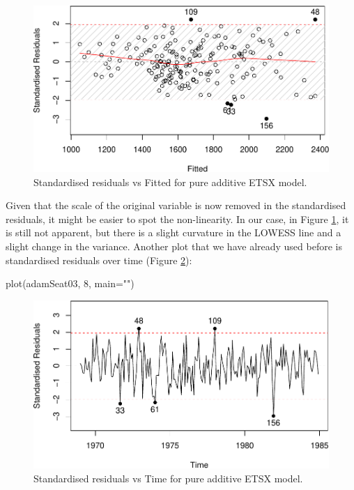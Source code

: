 \documentclass[
]{book}
\newenvironment{Shaded}{\begin{snugshade}}{\end{snugshade}}
\newcommand{\AttributeTok}[1]{\textcolor[rgb]{0.77,0.63,0.00}{#1}}
\newcommand{\DecValTok}[1]{\textcolor[rgb]{0.00,0.00,0.81}{#1}}
\newcommand{\FunctionTok}[1]{\textcolor[rgb]{0.00,0.00,0.00}{#1}}
\newcommand{\NormalTok}[1]{#1}
\newcommand{\StringTok}[1]{\textcolor[rgb]{0.31,0.60,0.02}{#1}}
\theoremstyle{definition}
\theoremstyle{definition}
\theoremstyle{definition}
\theoremstyle{definition}
\theoremstyle{remark}
\begin{document}
\begin{figure}
\centering
\includegraphics{Svetunkov--2022----ADAM_files/figure-latex/adamSeat03Resid-1.pdf}
\caption{\label{fig:adamSeat03Resid}Standardised residuals vs Fitted for pure additive ETSX model.}
\end{figure}

Given that the scale of the original variable is now removed in the standardised residuals, it might be easier to spot the non-linearity. In our case, in Figure \ref{fig:adamSeat03Resid}, it is still not apparent, but there is a slight curvature in the LOWESS line and a slight change in the variance. Another plot that we have already used before is standardised residuals over time (Figure \ref{fig:adamSeat03ResidTime}):

\begin{Shaded}
\begin{Highlighting}[]
\FunctionTok{plot}\NormalTok{(adamSeat03, }\DecValTok{8}\NormalTok{, }\AttributeTok{main=}\StringTok{""}\NormalTok{)}
\end{Highlighting}
\end{Shaded}

\begin{figure}
\centering
\includegraphics{Svetunkov--2022----ADAM_files/figure-latex/adamSeat03ResidTime-1.pdf}
\caption{\label{fig:adamSeat03ResidTime}Standardised residuals vs Time for pure additive ETSX model.}
\end{figure}
\end{document}
